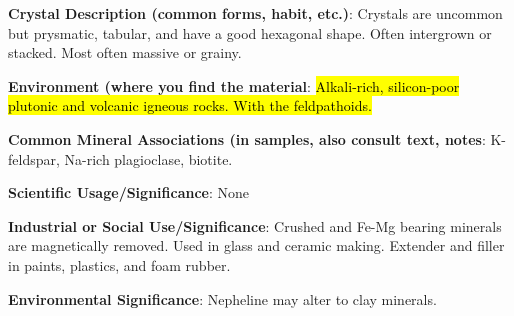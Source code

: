 \documentclass[10pt]{article}
\begin{document}
\begin{framed}
  \textbf{Crystal Description (common forms, habit, etc.)}: Crystals are uncommon but prysmatic, tabular, and have a good hexagonal shape. Often intergrown or stacked. Most often massive or grainy.
\end{framed}

\begin{framed}
  \textbf{Environment (where you find the material}: \hl{Alkali-rich, silicon-poor plutonic and volcanic igneous rocks. With the feldpathoids.}
\end{framed}

\begin{framed}
  \textbf{Common Mineral Associations (in samples, also consult text, notes}: K-feldspar, Na-rich plagioclase, biotite.
\end{framed}

\begin{framed}
  \textbf{Scientific Usage/Significance}: None
\end{framed}

\begin{framed}
  \textbf{Industrial or Social Use/Significance}: Crushed and Fe-Mg bearing minerals are magnetically removed. Used in glass and ceramic making. Extender and filler in paints, plastics, and foam rubber.
\end{framed}

\begin{framed}
  \textbf{Environmental Significance}: Nepheline may alter to clay minerals.
\end{framed}

\end{document}

